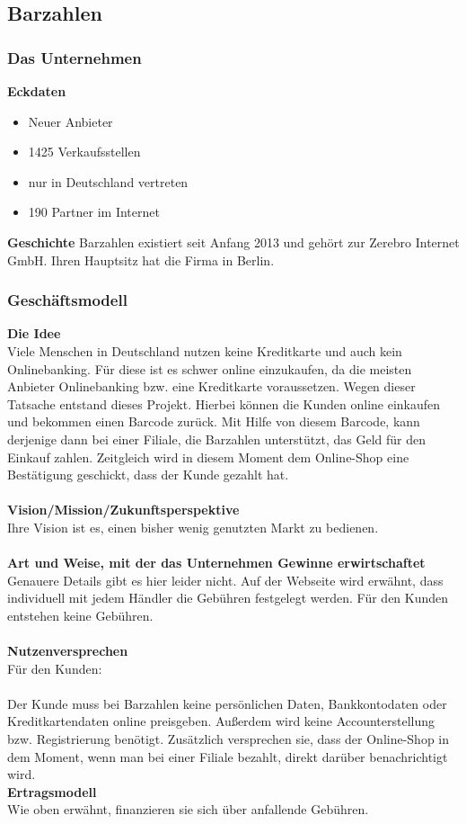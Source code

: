 \subsection{Barzahlen}
\subsubsection{Das Unternehmen}

\textbf{Eckdaten}
\begin{itemize}
\item Neuer Anbieter
\item 1425 Verkaufsstellen
\item nur in Deutschland vertreten
\item 190 Partner im Internet
\end{itemize}
%
%
\textbf{Geschichte}
Barzahlen existiert seit Anfang 2013 und gehört zur Zerebro Internet GmbH. Ihren Hauptsitz hat die Firma in Berlin.
\subsubsection{Geschäftsmodell}
\textbf{Die Idee}\\
Viele Menschen in Deutschland nutzen keine Kreditkarte und auch kein Onlinebanking. Für diese ist es schwer online 
einzukaufen, da die meisten Anbieter Onlinebanking bzw. eine Kreditkarte voraussetzen. Wegen dieser Tatsache entstand
dieses Projekt. Hierbei können die Kunden online einkaufen und bekommen einen Barcode zurück. Mit Hilfe von diesem
Barcode, kann derjenige dann bei einer Filiale, die Barzahlen unterstützt, das Geld für den Einkauf zahlen. Zeitgleich
wird in diesem Moment dem Online-Shop eine Bestätigung geschickt, dass der Kunde gezahlt hat.\\
\\
\textbf{Vision/Mission/Zukunftsperspektive}\\
Ihre Vision ist es, einen bisher wenig genutzten Markt zu bedienen.\\
\\
\textbf{Art und Weise, mit der das Unternehmen Gewinne erwirtschaftet}\\
Genauere Details gibt es hier leider nicht. Auf der Webseite wird erwähnt, dass individuell mit jedem Händler die 
Gebühren festgelegt werden. Für den Kunden entstehen keine Gebühren.\\
\\
\textbf{Nutzenversprechen}\\
Für den Kunden:\\
\\
Der Kunde muss bei Barzahlen keine persönlichen Daten, Bankkontodaten oder Kreditkartendaten online preisgeben. Außerdem wird keine Accounterstellung bzw. Registrierung benötigt. Zusätzlich versprechen sie, dass der Online-Shop in dem Moment, wenn man bei einer Filiale bezahlt, direkt darüber benachrichtigt wird.\\
\textbf{Ertragsmodell}\\
Wie oben erwähnt, finanzieren sie sich über anfallende Gebühren.
